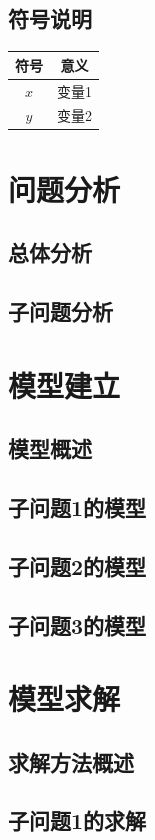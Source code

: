 \documentclass{cumcmthesis}
\begin{document}
\subsection{符号说明}
\begin{center}
\begin{tabular}{cc}
\toprule
符号 & 意义 \\
\midrule
$x$ & 变量1 \\
$y$ & 变量2 \\
\bottomrule
\end{tabular}
\end{center}

\section{问题分析}
\subsection{总体分析}
\subsection{子问题分析}

\section{模型建立}
\subsection{模型概述}
\subsection{子问题1的模型}
\subsection{子问题2的模型}
\subsection{子问题3的模型}

\section{模型求解}
\subsection{求解方法概述}
\subsection{子问题1的求解}
\end{document}
